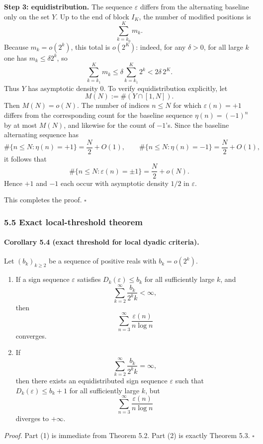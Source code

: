 \smallskip
\noindent\textbf{Step 3: equidistribution.}
The sequence \(\varepsilon\) differs from the alternating baseline only on the set \(Y\).  Up to the end of block \(I_K\), the number of modified positions is
\[
\sum_{k=k_0}^{K} m_k.
\]
Because \(m_k=o(2^k)\), this total is \(o(2^K)\): indeed, for any \(\delta>0\), for all large \(k\) one has \(m_k\le \delta 2^k\), so
\[
\sum_{k=k_1}^{K} m_k
\le \delta\sum_{k=k_1}^{K}2^k
< 2\delta\,2^K.
\]
Thus \(Y\) has asymptotic density \(0\).  To verify equidistribution explicitly, let
\[
M(N):=\#(Y\cap[1,N]).
\]
Then \(M(N)=o(N)\).  The number of indices \(n\le N\) for which \(\varepsilon(n)=+1\) differs from the corresponding count for the baseline sequence \(\eta(n)=(-1)^n\) by at most \(M(N)\), and likewise for the count of \(-1\)'s.  Since the baseline alternating sequence has
\[
\#\{n\le N:\eta(n)=+1\}=\frac{N}{2}+O(1),
\qquad
\#\{n\le N:\eta(n)=-1\}=\frac{N}{2}+O(1),
\]
it follows that
\[
\#\{n\le N:\varepsilon(n)=\pm 1\}=\frac{N}{2}+o(N).
\]
Hence \(+1\) and \(-1\) each occur with asymptotic density \(1/2\) in \(\varepsilon\).

This completes the proof.
\hfill$\square$

\subsubsection{5.5 Exact local-threshold theorem}

\paragraph{Corollary 5.4 (exact threshold for local dyadic criteria).}
Let \((b_k)_{k\ge 2}\) be a sequence of positive reals with \(b_k=o(2^k)\).
\begin{enumerate}
\item If a sign sequence \(\varepsilon\) satisfies \(D_k(\varepsilon)\le b_k\) for all sufficiently large \(k\), and
\[
\sum_{k=2}^{\infty}\frac{b_k}{2^k k}<\infty,
\]
then
\[
\sum_{n=3}^{\infty}\frac{\varepsilon(n)}{n\log n}
\]
converges.
\item If
\[
\sum_{k=2}^{\infty}\frac{b_k}{2^k k}=\infty,
\]
then there exists an equidistributed sign sequence \(\varepsilon\) such that \(D_k(\varepsilon)\le b_k+1\) for all sufficiently large \(k\), but
\[
\sum_{n=3}^{\infty}\frac{\varepsilon(n)}{n\log n}
\]
diverges to \(+\infty\).
\end{enumerate}

\emph{Proof.}
Part (1) is immediate from Theorem 5.2.  Part (2) is exactly Theorem 5.3.
\hfill$\square$

